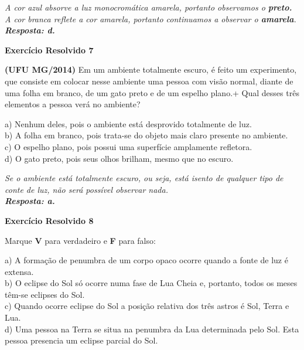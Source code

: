\documentclass[11pt,twocolumn,oneside]{article}
\newenvironment{resposta*}
  {\bf Resposta:\\ }
  {}
\begin{document}
\begin{resposta*}
{\it A cor azul absorve a luz monocromática amarela, portanto observamos o \textbf{preto.} A cor branca reflete a cor amarela, portanto continuamos a observar o \textbf{amarela}. \\
\textbf{Resposta: d.}}
\end{resposta*}

\textbf{Exercício Resolvido 7}


\textbf{(UFU MG/2014)} Em um ambiente totalmente escuro, é feito um experimento, que consiste em colocar nesse ambiente uma pessoa com visão normal, diante de uma folha em branco, de um gato preto e de um espelho plano.+
Qual desses três elementos a pessoa verá no ambiente?


a)	Nenhum deles, pois o ambiente está desprovido totalmente de luz. \\
b)	A folha em branco, pois trata-se do objeto mais claro presente no ambiente. \\
c)	O espelho plano, pois possui uma superfície amplamente refletora. \\
d)	O gato preto, pois seus olhos brilham, mesmo que no escuro. \\


\begin{resposta*}
{\it Se o ambiente está totalmente escuro, ou seja, está isento de qualquer tipo de conte de luz, não será possível observar nada. \\
\textbf{Resposta: a.}}
\end{resposta*}

\textbf{Exercício Resolvido 8}


Marque \textbf{V} para verdadeiro e \textbf{F} para falso:


a) A formação de penumbra de um corpo opaco ocorre quando a fonte de luz é extensa. \\
b) O eclipse do Sol só ocorre numa fase de Lua Cheia e, portanto, todos os meses têm-se eclipses do Sol. \\
c) Quando ocorre eclipse do Sol a posição relativa dos três astros é Sol, Terra e Lua. \\
d) Uma pessoa na Terra se situa na penumbra da Lua determinada pelo Sol. Esta pessoa presencia um eclipse parcial do Sol. \\
\end{document}
